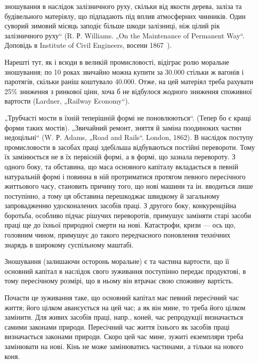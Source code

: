 \parcont{}  %
зношування в наслідок залізничного руху, скільки від якости дерева, заліза та будівельного
матеріялу, що підпадають під вплив атмосферних чинників. Один суворий зимовий місяць заподіє більше
шкоди залізниці, ніж цілий рік залізничного руху“ (R. Р. Williams. „On the Maintenance of Permanent
Way“. Доповідь в Institute of Civil Engineers, восени 1867~).

Нарешті тут, як і всюди в великій промисловості, відіграє ролю моральне зношування; по 10 роках
звичайно можна купити за \num{30.000} стільки ж вагонів і паротягів, скільки раніш коштувало \num{40.000}. Отже, на цей матеріял треба рахувати 25\% зниження з ринкової ціни, хоча б не відбулося
жодного зниження споживної вартости (Lardner,
„Railway Economy“).

„Трубчасті мости в їхній теперішній формі не поновлюються“. (Тепер бо є кращі форми таких мостів).
„Звичайний ремонт, зняття й заміна поодиноких частин недоцільні“ (W. Р. Adams, „Road and Rails“.
London, 1862). В наслідок поступу промисловости в засобах праці здебільша відбуваються постійні
перевороти. Тому їх замінюється не в їх первісній формі, а в формі, що зазнала перевороту. З одного
боку, та обставина,
що маса основного капіталу вкладається в певній натуральній формі і повинна в ній протриматися
протягом певного пересічного життьового часу, становить причину того, що нові машини та ін.
вводиться лише поступінно, а тому ця обставина перешкоджає швидкому й загальному запровадженню
удосконалених засобів праці. З другого боку, конкуренційна боротьба, особливо підчас рішучих
переворотів, примушує заміняти
старі засоби праці ще до їхньої природної смерти на нові. Катастрофи, кризи — ось що, головним
чином, примушує до такого передчасного поновлення технічних знарядь в широкому суспільному маштабі.

Зношування (залишаючи осторонь моральне) є та частина вартости, що її основний капітал в наслідок
свого зуживання поступінно передає продуктові, в тому пересічному розмірі, що в ньому він втрачає
свою споживну вартість.

Почасти це зуживання таке, що основний капітал має певний пересічний час життя; його цілком
авансується на цей час; а як він мине, то треба його цілком замінити. Для живих засобів праці,
напр., коней, час репродукції визначається самими законами природи. Пересічний час життя їхнього як
засобів праці визначається законами природи. Скоро цей час мине, зужиті екземпляри треба замінювати
на нові. Кінь не може замінюватись частинами, а тільки на нового коня.

